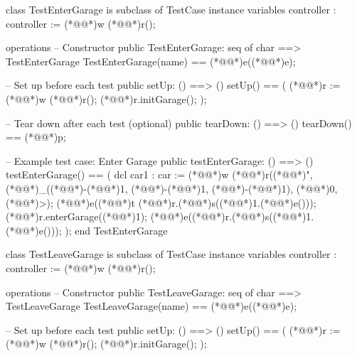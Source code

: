 \documentclass[a4paper]{article}
\begin{document}
\title{}
\author{}
\begin{vdm_al}
class TestEnterGarage is subclass of TestCase
instance variables
    controller : controller := (*@@*)w (*@@*)r();

operations
    -- Constructor
    public TestEnterGarage: seq of char ==> TestEnterGarage
    TestEnterGarage(name) == (*@@*)e((*@@*)e);

    -- Set up before each test
    public setUp: () ==> ()
    setUp() == 
    (
        (*@@*)r := (*@@*)w (*@@*)r();
        (*@@*)r.initGarage();
    );

    -- Tear down after each test (optional)
    public tearDown: () ==> ()
    tearDown() == (*@@*)p;

  
    -- Example test case: Enter Garage
    public testEnterGarage: () ==> ()
    testEnterGarage() ==
    (
        dcl car1 : car := (*@@*)w (*@@*)r((*@@*)", (*@@*)_((*@\vdmnotcovered{}@*)-(*@\vdmnotcovered{}@*)1, (*@\vdmnotcovered{}@*)-(*@\vdmnotcovered{}@*)1, (*@\vdmnotcovered{}@*)-(*@\vdmnotcovered{}@*)1), (*@\vdmnotcovered{}@*)0, (*@@*)>);
        (*@@*)e((*@@*)t (*@@*)r.(*@@*)s((*@@*)1.(*@@*)e()));
        (*@@*)r.enterGarage((*@@*)1);
        (*@@*)e((*@@*)r.(*@@*)s((*@@*)1.(*@@*)e()));
    );
end TestEnterGarage

class TestLeaveGarage is subclass of TestCase
instance variables
    controller : controller := (*@@*)w (*@@*)r();

operations
    -- Constructor
    public TestLeaveGarage: seq of char ==> TestLeaveGarage
    TestLeaveGarage(name) == (*@@*)e((*@@*)e);

    -- Set up before each test
    public setUp: () ==> ()
    setUp() == 
    (
        (*@@*)r := (*@@*)w (*@@*)r();
        (*@@*)r.initGarage();
    );


\end{vdm_al}
\end{document}

